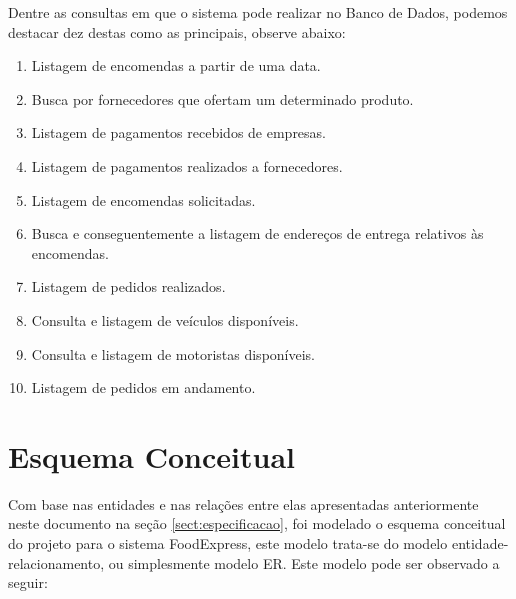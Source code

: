 \documentclass[12pt, onecolumn, titlepage]{article}
\begin{document}
Dentre as consultas em que o sistema pode realizar no Banco de Dados, podemos destacar dez destas como as principais, observe abaixo:

\begin{enumerate}

\item Listagem de encomendas a partir de uma data.

\item Busca por fornecedores que ofertam um determinado produto.

\item Listagem de pagamentos recebidos de empresas.

\item Listagem de pagamentos realizados a fornecedores.

\item Listagem de encomendas solicitadas.

\item Busca e conseguentemente a listagem de endereços de entrega relativos às encomendas.

\item Listagem de pedidos realizados.

\item Consulta e listagem de veículos disponíveis.

\item Consulta e listagem de motoristas disponíveis.

\item Listagem de pedidos em andamento.


\end{enumerate}

\newpage
\section{Esquema Conceitual}
\label{sect:conceitual}

Com base nas entidades e nas relações entre elas apresentadas anteriormente neste documento na seção \ref{sect:especificacao}, foi modelado o esquema conceitual do projeto para o sistema FoodExpress, este modelo trata-se do modelo entidade-relacionamento, ou simplesmente modelo ER. Este modelo pode ser observado a seguir:
\end{document}

